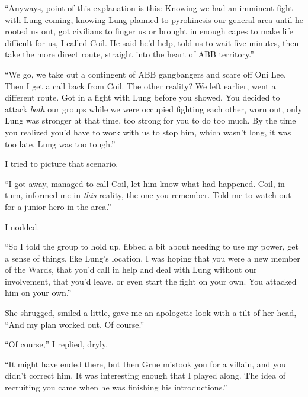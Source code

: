 ``Anyways, point of this explanation is this:  Knowing we had an imminent fight with Lung coming, knowing Lung planned to pyrokinesis our general area until he rooted us out, got civilians to finger us or brought in enough capes to make life difficult for us, I called Coil.  He said he'd help, told us to wait five minutes, then take the more direct route, straight into the heart of ABB territory.''



``We go, we take out a contingent of ABB gangbangers and scare off Oni Lee.  Then I get a call back from Coil.  The other reality?  We left earlier, went a different route.  Got in a fight with Lung before you showed.  You decided to attack \emph{both} our groups while we were occupied fighting each other, worn out, only Lung was stronger at that time, too strong for you to do too much.  By the time you realized you'd have to work with us to stop him, which wasn't long, it was too late.  Lung was too tough.''



I tried to picture that scenario.



``I got away, managed to call Coil, let him know what had happened.  Coil, in turn, informed me in \emph{this} reality, the one you remember.  Told me to watch out for a junior hero in the area.''



I nodded.



``So I told the group to hold up, fibbed a bit about needing to use my power, get a sense of things, like Lung's location.  I was hoping that you were a new member of the Wards, that you'd call in help and deal with Lung without our involvement, that you'd leave, or even start the fight on your own.  You attacked him on your own.''



She shrugged, smiled a little, gave me an apologetic look with a tilt of her head, ``And my plan worked out.  Of course.''



``Of course,'' I replied, dryly.



``It might have ended there, but then Grue mistook you for a villain, and you didn't correct him.  It was interesting enough that I played along.  The idea of recruiting you came when he was finishing his introductions.''



